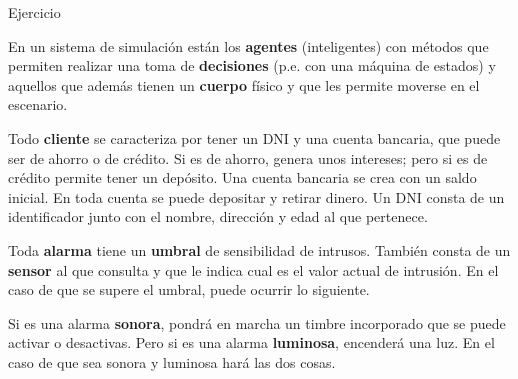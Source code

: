 \documentclass[10pt,envcountsect,spanish]{beamer}
\begin{document}
%
%
%
%
%
%
%
%
%
%







\begin{frame}{Ejercicio} \small 
\begin{ejercicio}{}
En un sistema de simulación están los \textbf{agentes} (inteligentes) con  métodos que permiten realizar una toma de \textbf{decisiones} (p.e. con una máquina de estados) y aquellos que además tienen un \textbf{cuerpo} físico y que les permite moverse en el escenario.
\end{ejercicio}

\begin{ejercicio}{}

Todo \textbf{cliente} se caracteriza por tener un DNI y una cuenta bancaria, que puede ser de ahorro o de crédito. Si es de ahorro, genera unos intereses; pero si es de crédito permite tener un depósito. Una cuenta bancaria se crea con un saldo inicial.  En toda cuenta se puede depositar y retirar dinero. Un DNI consta de un identificador junto con el nombre, dirección y edad al que pertenece.
\end{ejercicio}



\begin{ejercicio}{}
Toda \textbf{alarma} tiene un \textbf{umbral} de sensibilidad de intrusos. También consta de un \textbf{sensor} al que consulta y que le indica cual es el valor actual de intrusión. En el caso de que se supere el umbral, puede ocurrir lo siguiente.

Si es una alarma \textbf{sonora}, pondrá en marcha un timbre incorporado que se puede activar o desactivas. Pero si es una alarma \textbf{luminosa}, encenderá una luz. En el caso de que sea sonora y luminosa hará las dos cosas.
\end{ejercicio}

\end{frame}
\end{document}
